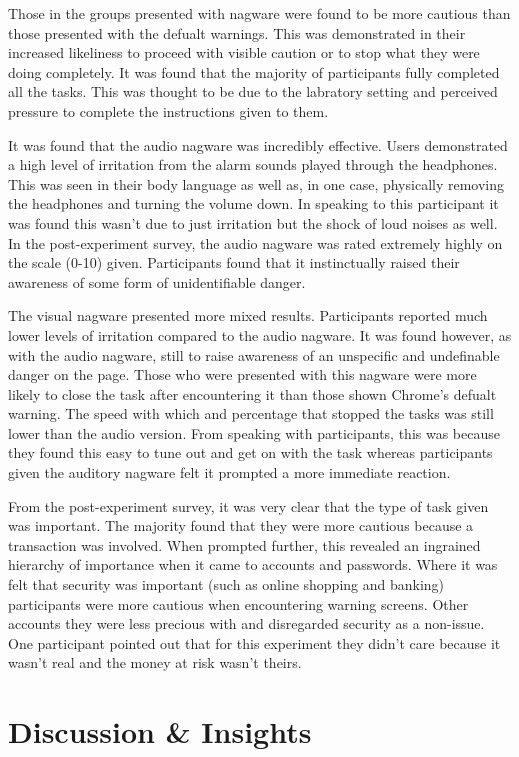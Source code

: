 \documentclass{mpaper}
\begin{document}
Those in the groups presented with nagware were found to be more cautious than those presented with the defualt warnings. This was demonstrated in their increased likeliness to proceed with visible caution or to stop what they were doing completely. It was found that the majority of participants fully completed all the tasks. This was thought to be due to the labratory setting and perceived pressure to complete the instructions given to them.

It was found that the audio nagware was incredibly effective. Users demonstrated a high level of irritation from the alarm sounds played through the headphones. This was seen in their body language as well as, in one case, physically removing the headphones and turning the volume down. In speaking to this participant it was found this wasn't due to just irritation but the shock of loud noises as well. In the post-experiment survey, the audio nagware was rated extremely highly on the scale (0-10) given. Participants found that it instinctually raised their awareness of some form of unidentifiable danger.

The visual nagware presented more mixed results. Participants reported much lower levels of irritation compared to the audio nagware. It was found however, as with the audio nagware, still to raise awareness of an unspecific and undefinable danger on the page. Those who were presented with this nagware were more likely to close the task after encountering it than those shown Chrome's defualt warning. The speed with which and percentage that stopped the tasks was still lower than the audio version. From speaking with participants, this was because they found this easy to tune out and get on with the task whereas participants given the auditory nagware felt it prompted a more immediate reaction.

From the post-experiment survey, it was very clear that the type of task given was important. The majority found that they were more cautious because a transaction was involved. When prompted further, this revealed an ingrained hierarchy of importance when it came to accounts and passwords. Where it was felt that security was important (such as online shopping and banking) participants were more cautious when encountering warning screens. Other accounts they were less precious with and disregarded security as a non-issue. One participant pointed out that for this experiment they didn't care because it wasn't real and the money at risk wasn't theirs.

\section{Discussion \& Insights}
\end{document}
